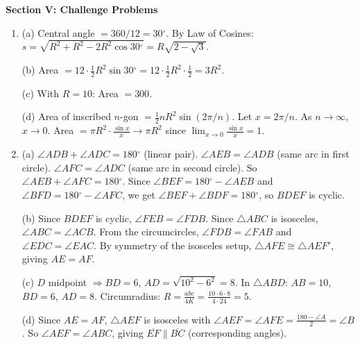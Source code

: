 \documentclass[12pt,addpoints]{exam}
\newcommand{\deg}{{}^\circ}
\begin{document}
\vspace{0.3cm}
\noindent\textbf{Section V: Challenge Problems}
\begin{enumerate}
  \item[39.] (a) Central angle $= 360/12 = 30\deg$. By Law of Cosines: $s = \sqrt{R^2 + R^2 - 2R^2\cos 30\deg} = R\sqrt{2 - \sqrt{3}}$.
  \par(b) Area $= 12 \cdot \frac{1}{2} R^2 \sin 30\deg = 12 \cdot \frac{1}{2} R^2 \cdot \frac{1}{2} = \boxed{3R^2}$.
  \par(c) With $R = 10$: Area $= \boxed{300}$.
  \par(d) Area of inscribed $n$-gon $= \frac{1}{2} n R^2 \sin(2\pi/n)$. Let $x = 2\pi/n$. As $n \to \infty$, $x \to 0$. Area $= \pi R^2 \cdot \frac{\sin x}{x} \to \pi R^2$ since $\lim_{x\to 0} \frac{\sin x}{x} = 1$.
  \item[40.] (a) $\angle ADB + \angle ADC = 180\deg$ (linear pair). $\angle AEB = \angle ADB$ (same arc in first circle). $\angle AFC = \angle ADC$ (same arc in second circle). So $\angle AEB + \angle AFC = 180\deg$. Since $\angle BEF = 180\deg - \angle AEB$ and $\angle BFD = 180\deg - \angle AFC$, we get $\angle BEF + \angle BDF = 180\deg$, so $BDEF$ is cyclic.
  \par(b) Since $BDEF$ is cyclic, $\angle FEB = \angle FDB$. Since $\triangle ABC$ is isosceles, $\angle ABC = \angle ACB$. From the circumcircles, $\angle FDB = \angle FAB$ and $\angle EDC = \angle EAC$. By symmetry of the isosceles setup, $\triangle AFE \cong \triangle AEF'$, giving $AE = AF$.
  \par(c) $D$ midpoint $\Rightarrow BD = 6$, $AD = \sqrt{10^2 - 6^2} = 8$. In $\triangle ABD$: $AB=10$, $BD=6$, $AD=8$. Circumradius: $R = \frac{abc}{4K} = \frac{10 \cdot 6 \cdot 8}{4 \cdot 24} = \boxed{5}$.
  \par(d) Since $AE = AF$, $\triangle AEF$ is isosceles with $\angle AEF = \angle AFE = \frac{180 - \angle A}{2} = \angle B$. So $\angle AEF = \angle ABC$, giving $\overline{EF} \parallel \overline{BC}$ (corresponding angles).
\end{enumerate}
\end{document}
